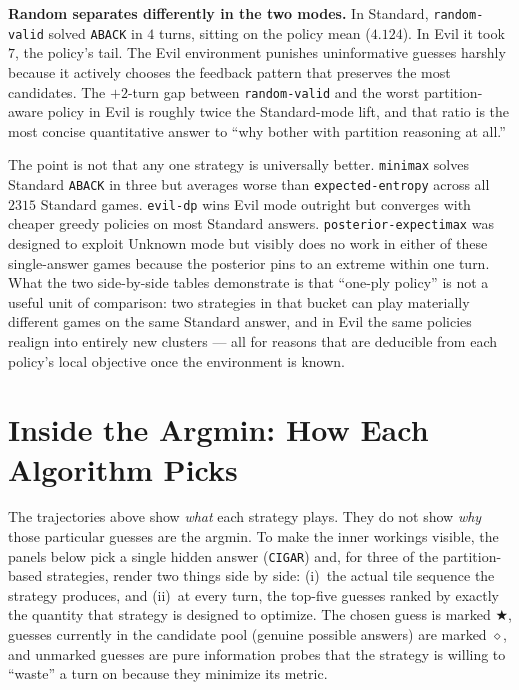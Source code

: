 \documentclass[11pt]{article}
\begin{document}
\textbf{Random separates differently in the two modes.} In Standard,
\texttt{random-valid} solved \texttt{ABACK} in $4$ turns, sitting on
the policy mean ($4.124$). In Evil it took $7$, the policy's tail.
The Evil environment punishes uninformative guesses harshly because
it actively chooses the feedback pattern that preserves the most
candidates. The $+2$-turn gap between \texttt{random-valid} and the
worst partition-aware policy in Evil is roughly twice the
Standard-mode lift, and that ratio is the most concise quantitative
answer to ``why bother with partition reasoning at all.''

The point is not that any one strategy is universally better.
\texttt{minimax} solves Standard \texttt{ABACK} in three but
averages worse than \texttt{expected-entropy} across all
$\num{2315}$ Standard games. \texttt{evil-dp} wins Evil mode
outright but converges with cheaper greedy policies on most
Standard answers. \texttt{posterior-expectimax} was designed to
exploit Unknown mode but visibly does no work in either of these
single-answer games because the posterior pins to an extreme
within one turn. What the two side-by-side tables demonstrate is
that ``one-ply policy'' is not a useful unit of comparison: two
strategies in that bucket can play materially different games on
the same Standard answer, and in Evil the same policies realign
into entirely new clusters --- all for reasons that are deducible
from each policy's local objective once the environment is known.

\section*{Inside the Argmin: How Each Algorithm Picks}

The trajectories above show \emph{what} each strategy plays. They do
not show \emph{why} those particular guesses are the argmin. To make
the inner workings visible, the panels below pick a single hidden
answer (\texttt{CIGAR}) and, for three of the partition-based
strategies, render two things side by side: (i)~the actual tile
sequence the strategy produces, and (ii)~at every turn, the top-five
guesses ranked by exactly the quantity that strategy is designed to
optimize. The chosen guess is marked $\bigstar$, guesses currently
in the candidate pool (genuine possible answers) are marked
$\diamond$, and unmarked guesses are pure information probes that
the strategy is willing to ``waste'' a turn on because they minimize
its metric.
\end{document}
